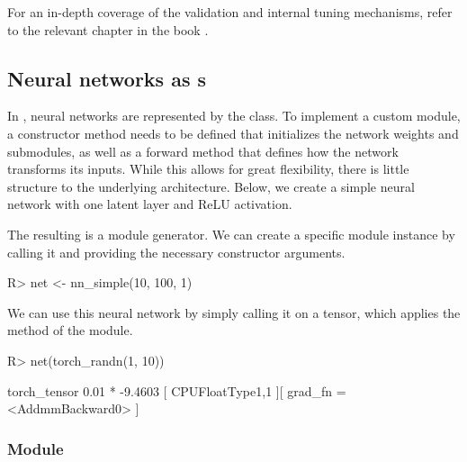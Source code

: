 \documentclass[article]{jss}
\theoremstyle{definition}
\begin{document}
For an in-depth coverage of the validation and internal tuning mechanisms, refer to the relevant  chapter in the  book \citep{ref-mlr3book-valid}.

\subsection[Neural networks as Graphs]{Neural networks as s}

In , neural networks are represented by the  class.
To implement a custom module, a constructor method needs to be defined that initializes the network weights and submodules, as well as a forward method that defines how the network transforms its inputs.
While this allows for great flexibility, there is little structure to the underlying architecture.
Below, we create a simple neural network with one latent layer and ReLU activation.


The resulting  is a module generator.
We can create a specific module instance by calling it and providing the necessary constructor arguments.

\begin{CodeInput}
R> net <- nn_simple(10, 100, 1)
\end{CodeInput}

We can use this neural network by simply calling it on a tensor, which applies the  method of the module.

\begin{CodeInput}
R> net(torch_randn(1, 10))
\end{CodeInput}

\begin{CodeOutput}
torch_tensor
0.01 *
-9.4603
[ CPUFloatType{1,1} ][ grad_fn = <AddmmBackward0> ]
\end{CodeOutput}

\subsubsection[Module Graph]{Module }
\end{document}
